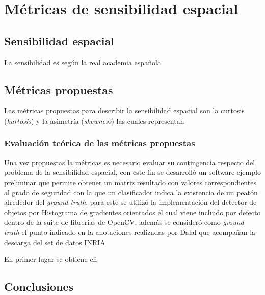 
\chapter{M\'etricas de sensibilidad espacial}
\label{cap:metricas}


\section{Sensibilidad espacial}
\label{metricas:sensibilidad}

La sensibilidad es según la real academia española 

\section{M\'etricas propuestas}
\label{metricas:propuestas}

Las m\'etricas propuestas para describir la sensibilidad espacial son la curtosis (\textit{kurtosis}) y la asimetría (\textit{skewness}) las cuales representan 

\subsection{Evaluaci\'on teórica de las m\'etricas propuestas}
\label{propuestas:evaluacion}

Una vez propuestas la m\'etricas es necesario evaluar su contingencia respecto del problema de la sensibilidad espacial, con este fin se desarroll\'o un software ejemplo preliminar que permite obtener un matriz resultado con valores correspondientes al grado de seguridad con la que un clasificador indica la existencia de un peatón alrededor del \textit{ground truth}, para  este se utiliz\'o la implementación del detector de objetos por Histograma de gradientes orientados \citep{Dalal2005} el cual viene incluido por defecto dentro de la suite de librer\'ias de OpenCV, adem\'as se consider\'o como \textit{ground truth} el punto indicado en la anotaciones realizadas por Dalal que acompa\~nan la descarga del set de datos INRIA

En primer lugar se obtiene eñ 



\section{Conclusiones}
\label{metricas:conclusiones}